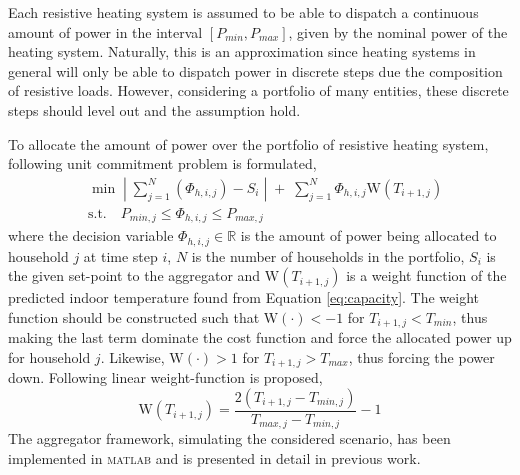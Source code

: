 Each resistive heating system is assumed to be able to dispatch a continuous amount of power in the interval $\left[P_{min}, P_{max}\right]$, given by the nominal power of the heating system. Naturally, this is an approximation since heating systems in general will only be able to dispatch power in discrete steps due the composition of resistive loads. However, considering a portfolio of many entities, these discrete steps should level out and the assumption hold. 

To allocate the amount of power over the portfolio of resistive heating system, following unit commitment problem is formulated,
\begin{align}\label{eq:agg_dispatch}
  & \min\;\left|\; \sum_{j=1}^N \left(\Phi_{h,i,j}\right) - S_i \;\right|\; + \; \sum^{N}_{j=1}\Phi_{h,i,j}\mbox{W}\left(T_{i+1,j}\right)	\\[5mm]\nonumber
  & \mbox{s.t.} \quad P_{min,j} \leq \Phi_{h,i,j} \leq P_{max,j}  
\end{align}
where the decision variable  $\Phi_{h,i,j}\in\mathbb{R}$ is the amount of power being allocated to household $j$ at time step $i$, $N$ is the number of households in the portfolio, $S_i$ is the given set-point to the aggregator and $\mbox{W}\left(T_{i+1,j}\right)$ is a weight function of the predicted indoor temperature found from Equation \eqref{eq:capacity}. The weight function should be constructed such that $\mbox{W}\left(\cdot\right)<-1$ for $T_{i+1,j} < T_{min}$, thus making the last term dominate the cost function and force the allocated power up for household $j$. Likewise, $\mbox{W}\left(\cdot\right)>1$ for $T_{i+1,j} > T_{max}$, thus forcing the power down. Following linear weight-function is proposed,
\begin{equation}\label{eq:weight_fct}
  \mbox{W}\left(T_{i+1,j}\right) = \frac{2\left(T_{i+1,j}-T_{min,j} \right)}{T_{max,j} - T_{min,j}}-1 
\end{equation}
The aggregator framework, simulating the considered scenario, has been implemented in \textsc{matlab} and is presented in detail in previous work.

